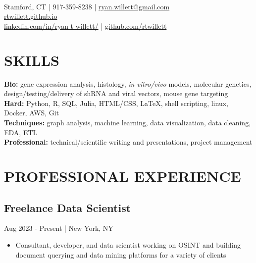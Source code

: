 \documentclass[11pt]{article}
\title{\vspace{-7cm}}
\date{}
\author{Ryan Willett}
\newenvironment{myitemize}
{ \begin{itemize}
	\setlength{\itemsep}{0pt}
	\setlength{\parskip}{0pt}
	\setlength{\parsep}{0pt}     }
{ \end{itemize}                  }
\begin{document}
\maketitle

\section*{}
  \\
\normalsize
Stamford, CT | 917-359-8238 | \href{mailto:ryan.willett@gmail.com}{ryan.willett@gmail.com} \\
\href{http://rtwillett.github.io}{rtwillett.github.io} \\
\href{https://linkedin.com/in/ryan-t-willett/}{linkedin.com/in/ryan-t-willett/} | \href{https://github.com/rtwillett}{github.com/rtwillett}

\raggedright
\vspace{-3truemm}


\section*{SKILLS}
\vspace{-3truemm}
{\bfseries Bio:} gene expression analysis, histology, \textit{in vitro/vivo} models, molecular genetics, design/testing/delivery of shRNA and viral vectors, mouse gene targeting \\
{\bfseries Hard:} Python, R, SQL, Julia, HTML/CSS, \LaTeX, shell scripting, linux, Docker, AWS, Git \\
{\bfseries Techniques:} graph analysis, machine learning, data visualization, data cleaning, EDA, ETL \\
{\bfseries Professional:} technical/scientific writing and presentations, project management

\section*{PROFESSIONAL EXPERIENCE}

\subsection*{Freelance Data Scientist}
\vspace{-3truemm}

{\bfseries}Aug 2023 - Present | New York, NY
\begin{myitemize}
	\item Consultant, developer, and data scientist working on OSINT and building document querying and data mining platforms for a variety of clients
\end{myitemize}
\end{document}
